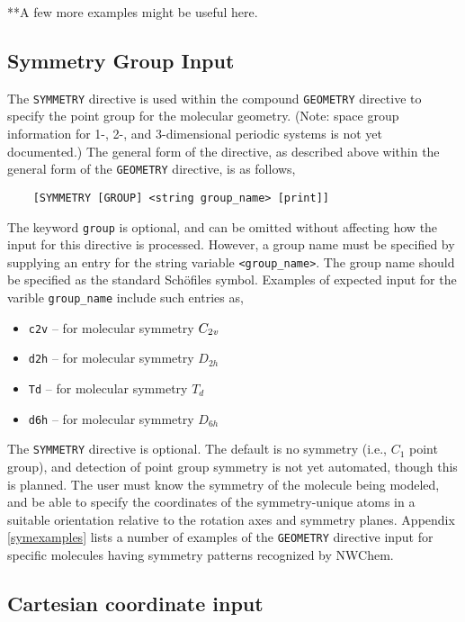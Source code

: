 \Large
**A few more examples might be useful here.
\normalsize

\subsection{Symmetry Group Input}

The \verb+SYMMETRY+ directive is used within the compound \verb+GEOMETRY+
directive to specify the point group for the
molecular geometry. (Note: space group information for 1-, 2-, and
3-dimensional periodic systems is not yet documented.)
The general form of the directive, as described above within the general
form of the \verb+GEOMETRY+ directive, is as follows,
\begin{verbatim}
    [SYMMETRY [GROUP] <string group_name> [print]]
\end{verbatim}
The keyword \verb+group+ is optional, and can be omitted without affecting
how the input for this directive is processed.
However, a group name must be specified by supplying an entry for the
string variable \verb+<group_name>+.  The
group name should be specified as the standard Sch\"{o}files symbol.
Examples of expected input for the varible \verb+group_name+ include
such entries as,

\begin{itemize}
\item \verb+c2v+ -- for molecular symmetry $C_{2{\it v}}$
\item \verb+d2h+ -- for molecular symmetry $D_{2h}$
\item \verb+Td+ -- for molecular symmetry $T_d$
\item \verb+d6h+ -- for molecular symmetry $D_{6h}$
\end{itemize}

The \verb+SYMMETRY+ directive is optional.  The default is no symmetry 
(i.e., $C_1$ point group), and detection of point
group symmetry is not yet automated, though this is planned.  The user
must know the symmetry of the molecule being modeled, and be able
to specify the coordinates of the symmetry-unique atoms in a suitable
orientation relative to the rotation axes and symmetry planes.
Appendix \ref{symexamples} lists a number of examples of the
\verb+GEOMETRY+ directive input for specific molecules having symmetry
patterns recognized by NWChem.

\subsection{Cartesian coordinate input}
\label{sec:cart}

